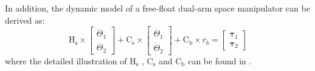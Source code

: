 \documentclass{article}
\begin{document}
In addition, the dynamic model of a free-float dual-arm space manipulator can be derived as:
\begin{equation}
  \label{eq32}
\mathrm{H_s} \times \begin{bmatrix} {\ddot{\Theta}_{1}} \\{\ddot{\Theta}_{2}} \end{bmatrix} +\mathrm{C_s} \times \begin{bmatrix} {\dot{\Theta}_{1}} \\{\dot{\Theta}_{2}} \end{bmatrix} +\mathrm{C_b} \times \dot {r_{b}}=\begin{bmatrix} \mathbf \tau_1 \\\mathbf \tau_2 \end{bmatrix}
\end{equation}
where the detailed illustration of  $\mathrm{H_s}$ , $\mathrm{C_s}$ and $\mathrm{C_b} $ can be found in \cite{yan2021trajectory}.



\end{document}
